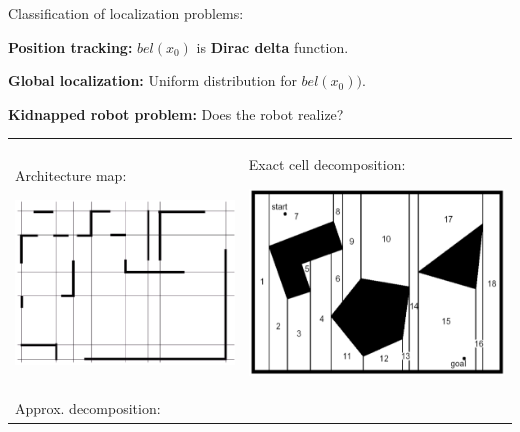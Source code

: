 \documentclass[landscape]{article}
\newcommand{\vpspace}{\vspace{5pt}}
\begin{document}
\begin{multicols}{3}
\vpspace

\begin{minipage}{\columnwidth}
  Classification of localization problems:
  \begin{compactitem}
  \item \textbf{Position tracking:} $bel(x_0)$ is \textbf{Dirac delta}
    function.
  \item \textbf{Global localization:} Uniform distribution for $bel(x_0))$.
  \item \textbf{Kidnapped robot problem:} Does the robot realize?
  \end{compactitem}
\end{minipage}

\vpspace

\begin{minipage}{\columnwidth}
  \begin{tabular}{p{}p{}}
    Architecture map:\newline

    \vspace{-20pt}

    \begin{center}
      \includegraphics[width=0.28\columnwidth]{img/8_Architecture.png}
    \end{center}
    & Exact cell decomposition:\newline

    \vspace{-20pt}

    \begin{center}
      \includegraphics[width=0.29\columnwidth]{img/8_Exact.png}
    \end{center}
    \\[-12pt]
    Approx. decomposition:\newline

    \vspace{-20pt}


\end{tabular}
\end{minipage}
\end{multicols}
\end{document}
